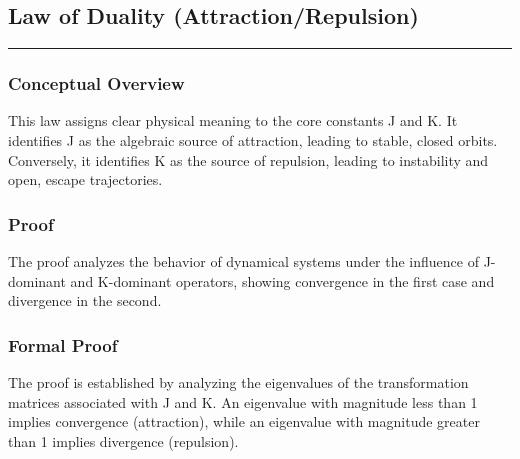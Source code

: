 
\subsection*{Law of Duality (Attraction/Repulsion)}
\hrule
\vspace{0.3cm}
\vspace{0.5cm}

\subsubsection*{Conceptual Overview}
This law assigns clear physical meaning to the core constants J and K. It identifies J as the algebraic source of attraction, leading to stable, closed orbits. Conversely, it identifies K as the source of repulsion, leading to instability and open, escape trajectories.

\subsubsection*{Proof}
The proof analyzes the behavior of dynamical systems under the influence of J-dominant and K-dominant operators, showing convergence in the first case and divergence in the second.

\subsubsection*{Formal Proof}
The proof is established by analyzing the eigenvalues of the transformation matrices associated with J and K. An eigenvalue with magnitude less than 1 implies convergence (attraction), while an eigenvalue with magnitude greater than 1 implies divergence (repulsion).

